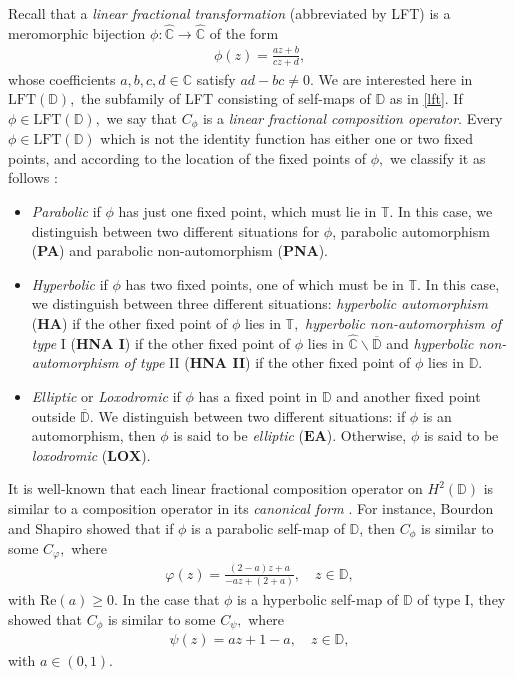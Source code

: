 \documentclass[11pt]{amsart}
\theoremstyle{plain}
\theoremstyle{remark}
\theoremstyle{plain}
\begin{document}
 Recall that a \textit{linear fractional transformation} (abbreviated by LFT) is a meromorphic bijection $\phi:\widehat{\mathbb{C}}\to \widehat{\mathbb{C}}$ of the form
\begin{align}\label{lft}
\phi(z) = \frac{az + b}{cz + d}, 
\end{align}
whose coefficients $a, b, c, d \in \mathbb{C}$ satisfy $ad - bc \neq 0.$ 
We are interested here in  $\mathrm{LFT}(\mathbb{D}),$ the subfamily of LFT consisting of self-maps of $\mathbb{D}$ as in \eqref{lft}. If $\phi\in \mathrm{LFT}(\mathbb{D}),$ we say that $C_{\phi}$ is a \textit{linear fractional composition operator}. Every $\phi\in \mathrm{LFT}(\mathbb{D})$ which is not the identity function has either one or two fixed points, and according to the location of the fixed points of $\phi,$ we classify it as follows \cite{Shapiro_Bourdon_Livro_Ciclicidade, Gallardo-Gutierrez,Shapiro_livro_compopandfunctiontheory}:
\begin{itemize}
\item \textit{Parabolic} if $\phi$ has just one fixed point, which must lie in $\mathbb{T}.$ In this case, we distinguish between two different situations for $\phi$,    parabolic automorphism (\textbf{PA}) and parabolic non-automorphism (\textbf{PNA}). 
\item \textit{Hyperbolic} if $\phi$ has two fixed points, one of which must be in $\mathbb{T}.$ In this case, we distinguish between three different situations: \textit{hyperbolic automorphism} (\textbf{HA}) if the other fixed point of $\phi$ lies in $\mathbb{T},$ \textit{hyperbolic non-automorphism of type} I (\textbf{HNA I}) if the other fixed point of $\phi$ lies  in $\widehat{\mathbb{C}}\backslash \overline{\mathbb{D}}$ and  \textit{hyperbolic non-automorphism of type} II (\textbf{HNA II}) if the other fixed point of $\phi$ lies in $\mathbb{D}.$

\item \textit{Elliptic} or \textit{Loxodromic} if $\phi$ has a fixed point in $\mathbb{D}$ and another fixed point outside $\overline{\mathbb{D}}.$ We distinguish between two different situations: if $\phi$ is an automorphism,
then $\phi$ is said to be \textit{elliptic} ($\textbf{EA}$). Otherwise, $\phi$ is said to be \textit{loxodromic} ($\textbf{LOX}$). 
\end{itemize}
It is well-known that each linear fractional composition operator on  $H^2(\mathbb{D})$ is similar to a composition operator in its \textit{canonical form}  \cite{Shapiro_Bourdon_Livro_Ciclicidade}. For instance, Bourdon and Shapiro \cite[page 28]{Shapiro_Bourdon_Livro_Ciclicidade} showed that if $\phi$ is a parabolic self-map of $\mathbb{D}$, then $C_{\phi}$ is similar to some $C_{\varphi},$ where
\begin{align*}
\varphi(z)=\frac{(2-a)z+a}{-az+(2+a)}, \quad z\in \mathbb{D},
\end{align*}
with $\mathrm{Re}(a)\geq0.$ In the case that $\phi$ is a hyperbolic self-map of $\mathbb{D}$ of type I, they showed that $C_{\phi}$ is similar to some $C_{\psi},$ where 
\begin{align*}
\psi(z)=az+1-a, \quad z\in \mathbb{D},
\end{align*}
with $a\in (0,1).$
\end{document}
